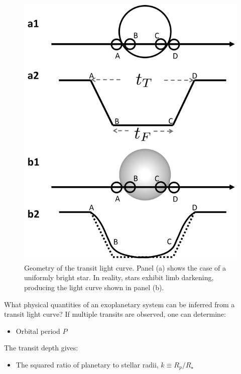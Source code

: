 \begin{figure}[htb]
\begin{center}
	\includegraphics[width=\linewidth]{fig/transitmodel.png}
	\caption{Geometry of the transit light curve. Panel (a) shows the case of a uniformly bright star. In reality, stars exhibit limb darkening, producing the light curve shown in panel (b).}
	\label{fig:transitmodel}
\end{center}
\end{figure}

What physical quantities of an exoplanetary system can be inferred from a transit light curve?  
If multiple transits are observed, one can determine:  
\begin{itemize}
\item Orbital period $P$
\end{itemize}

The transit depth gives:
\begin{itemize}
\item The squared ratio of planetary to stellar radii, $k \equiv R_p/R_\star$
\end{itemize}

